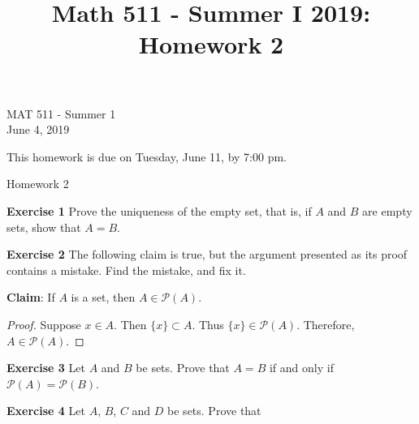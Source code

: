 \documentclass[12pt,oneside]{exam}
\title{Math 511 - Summer I 2019: Homework 2}
\newenvironment{exercise}[1]{\vspace{.1in}\noindent\textbf{Exercise #1 \hspace{.05em}}}{}
\begin{document}
\begin{flushright}
\sc MAT 511 - Summer 1\\
June 4, 2019
\end{flushright}
\bigskip

This homework is due on Tuesday, June 11, by 7:00 pm. 
\begin{center}
\textsf{Homework 2} 
\end{center}


\begin{exercise}{1}
Prove the uniqueness of the empty set, that is, if $A$ and $B$ are empty sets, show that $A = B$. 
\end{exercise}

\begin{exercise}{2}
The following claim is true, but the argument presented as its proof contains a mistake. Find the mistake, and fix it. 

\textbf{Claim}: If $A$ is a set, then $A \in \mathcal{P}(A)$. 

\begin{proof}
Suppose $x \in A$. Then $\{x\} \subset A$. Thus $\{x\} \in \mathcal{P}(A)$. Therefore, $A \in \mathcal{P}(A)$.
\end{proof}
\end{exercise}

\begin{exercise}{3}
Let $A$ and $B$ be sets. Prove that $A = B$ if and only if $\mathcal{P}(A)=\mathcal{P}(B)$.
\end{exercise}

\begin{exercise}{4}
Let $A$, $B$, $C$ and $D$ be sets. Prove that
\end{exercise}
\end{document}
